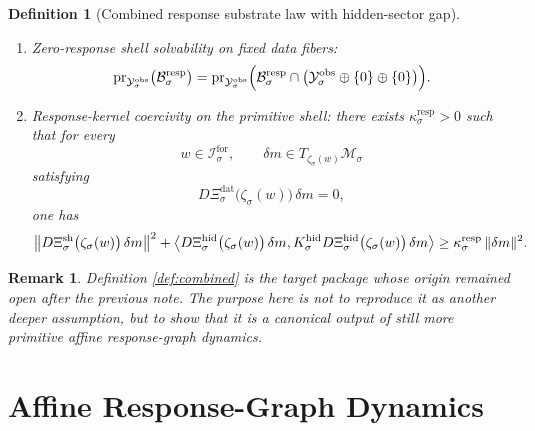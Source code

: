 \documentclass[11pt]{article}
\newcommand{\ForSpace}[1]{\mathcal I_{#1}^{\mathrm{for}}}
\newcommand{\Reduction}[1]{\mathcal R_{#1}}
\newcommand{\CurrentCarrier}[1]{\mathfrak C_{#1}^{\mathrm{cur}}}
\newcommand{\EqCarrier}[1]{\mathfrak C_{#1}^{\mathrm{eq}}}
\newcommand{\DataSpace}[1]{\mathcal Y_{#1}^{\mathrm{obs}}}
\newcommand{\ProtoSpace}[1]{\mathcal M_{#1}}
\newcommand{\ResponseData}[1]{\Xi_{#1}^{\mathrm{dat}}}
\newcommand{\ResponseShell}[1]{\Xi_{#1}^{\mathrm{sh}}}
\newcommand{\ResponseHidden}[1]{\Xi_{#1}^{\mathrm{hid}}}
\newcommand{\ResponseImage}[1]{\mathcal B_{#1}^{\mathrm{resp}}}
\newcommand{\HiddenOperator}[1]{K_{#1}^{\mathrm{hid}}}
\newcommand{\ProtoEmbed}[1]{\zeta_{#1}}
\newtheorem{definition}{Definition}
\newtheorem{remark}{Remark}
\begin{document}
\begin{definition}[Combined response substrate law with hidden-sector gap]
\begin{enumerate}
\begin{equation}
    =
    \bigl(
    \jmath_{\sigma}(\Reduction{\sigma}(w)),
    \CurrentCarrier{\sigma}(w),
    \EqCarrier{\sigma}(w)
    \bigr)
    \label{eq:combinedcompat}
    \end{equation}
    for every \(w\in\ForSpace{\sigma}\).
    \item Zero-response shell solvability on fixed data fibers:
    \begin{equation}
    \operatorname{pr}_{\DataSpace{\sigma}}\bigl(\ResponseImage{\sigma}\bigr)
    =
    \operatorname{pr}_{\DataSpace{\sigma}}
    \Bigl(
    \ResponseImage{\sigma}\cap
    \bigl(
    \DataSpace{\sigma}\oplus\{0\}\oplus\{0\}
    \bigr)
    \Bigr).
    \label{eq:combinedsolvability}
    \end{equation}
    \item Response-kernel coercivity on the primitive shell: there exists \(\kappa_{\sigma}^{\mathrm{resp}}>0\) such that for every
    \[
    w\in\ForSpace{\sigma},
    \qquad
    \delta m\in T_{\ProtoEmbed{\sigma}(w)}\ProtoSpace{\sigma}
    \]
    satisfying
    \[
    D\ResponseData{\sigma}\bigl(\ProtoEmbed{\sigma}(w)\bigr)\,\delta m=0,
    \]
    one has
    \begin{equation}
    \bigl\|
    D\ResponseShell{\sigma}\bigl(\ProtoEmbed{\sigma}(w)\bigr)\,\delta m
    \bigr\|^{2}
    +
    \ev{
    D\ResponseHidden{\sigma}\bigl(\ProtoEmbed{\sigma}(w)\bigr)\,\delta m,
    \HiddenOperator{\sigma}
    D\ResponseHidden{\sigma}\bigl(\ProtoEmbed{\sigma}(w)\bigr)\,\delta m
    }
    \ge
    \kappa_{\sigma}^{\mathrm{resp}}\,
    \|\delta m\|^{2}.
    \label{eq:combinedcoercive}
    \end{equation}
\end{enumerate}
\end{definition}

\begin{remark}
Definition \ref{def:combined} is the target package whose origin remained open after the previous note. The purpose here is not to reproduce it as another deeper assumption, but to show that it is a canonical output of still more primitive affine response-graph dynamics.
\end{remark}

\section{Affine Response-Graph Dynamics}
\end{document}
